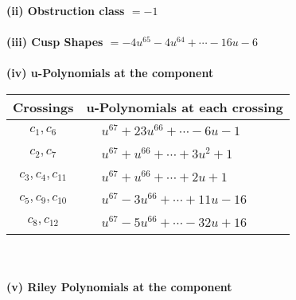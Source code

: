 \documentclass[1p]{elsarticle_modified}
\theoremstyle{definition}
\begin{document}
\flushleft \textbf{(ii) Obstruction class $= -1$}\\~\\
\flushleft \textbf{(iii) Cusp Shapes $= -4 u^{65}-4 u^{64}+\cdots-16 u-6$}\\~\\
\newpage\renewcommand{\arraystretch}{1}
\flushleft \textbf{(iv) u-Polynomials at the component}\newline \\
\begin{tabular}{m{50pt}|m{274pt}}
Crossings & \hspace{64pt}u-Polynomials at each crossing \\
\hline $$\begin{aligned}c_{1},c_{6}\end{aligned}$$&$\begin{aligned}
&u^{67}+23 u^{66}+\cdots-6 u-1
\end{aligned}$\\
\hline $$\begin{aligned}c_{2},c_{7}\end{aligned}$$&$\begin{aligned}
&u^{67}+u^{66}+\cdots+3 u^2+1
\end{aligned}$\\
\hline $$\begin{aligned}c_{3},c_{4},c_{11}\end{aligned}$$&$\begin{aligned}
&u^{67}+u^{66}+\cdots+2 u+1
\end{aligned}$\\
\hline $$\begin{aligned}c_{5},c_{9},c_{10}\end{aligned}$$&$\begin{aligned}
&u^{67}-3 u^{66}+\cdots+11 u-16
\end{aligned}$\\
\hline $$\begin{aligned}c_{8},c_{12}\end{aligned}$$&$\begin{aligned}
&u^{67}-5 u^{66}+\cdots-32 u+16
\end{aligned}$\\
\hline
\end{tabular}\\~\\
\newpage\renewcommand{\arraystretch}{1}
\flushleft \textbf{(v) Riley Polynomials at the component}\newline \\
\end{document}
